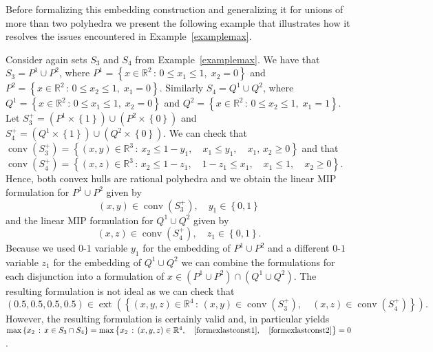 \documentclass[mnsc]{informs3}
\newcommand{\set}[1]{\left\{#1\right\}}                     %
\newcommand{\bra}[1]{\left(#1\right)}
\newcommand{\Real}{\mathbb R}
\DeclareMathOperator{\conv}{conv}
\DeclareMathOperator{\ext}{ext}
\begin{document}
Before formalizing this embedding construction and generalizing it for unions of more than two polyhedra we present the following example that illustrates how it resolves the issues encountered in Example~\ref{examplemax}.
\begin{example}\label{examplemaxfixed} Consider again sets $S_3$ and $S_4$ from Example~\ref{examplemax}. We have that $S_3=P^1\cup P^2$,  where $P^1=\set{x\in \Real^2\,:\, 0\leq x_1\leq 1,\;x_2=0}$ and $P^2=\set{x\in \Real^2\,:\, 0\leq x_2\leq 1,\;x_1=0}$. Similarly $S_4=Q^1\cup Q^2$,  where $Q^1=\set{x\in \Real^2\,:\, 0\leq x_1\leq 1,\;x_2=0}$ and $Q^2=\set{x\in \Real^2\,:\, 0\leq x_2\leq 1,\;x_1=1}$. Let $S_3^+=\bra{P^1\times \set{1}} \cup \bra{P^2\times \set{0}}$ and $S_4^+=\bra{Q^1\times \set{1}} \cup \bra{Q^2\times \set{0}}$. We can check that $\conv\bra{S_3^+}=\set{\bra{x,y}\in \Real^3\,:\, x_2\leq 1-y_1,\quad x_1\leq y_1,\quad x_1,\,x_2\geq 0}$ and that  $\conv\bra{S_4^+}=\set{\bra{x,z}\in \Real^3\,:\,  x_2\leq 1-z_1,\quad 1-z_1 \leq x_1, \quad x_1\leq 1,\quad x_2\geq 0}$. Hence, both convex hulls are rational polyhedra and we obtain the linear MIP formulation for  $P^1\cup P^2$ given by 
\begin{equation}\label{formexlastconst1}
\bra{x,y}\in \conv\bra{S_3^+}, \quad y_1\in \set{0,1}
\end{equation}
and the linear MIP formulation for $Q^1\cup Q^2$  given by 
\begin{equation}\label{formexlastconst2}
\bra{x,z}\in \conv\bra{S_4^+}, \quad z_1\in \set{0,1}.
\end{equation}
Because we used $0$-$1$ variable $y_1$ for the embedding of $P^1\cup P^2$ and a different $0$-$1$ variable $z_1$ for the embedding of $Q^1\cup Q^2$ we can combine the formulations for each disjunction into a formulation of $x\in \bra{P^1\cup P^2}\cap \bra{Q^1\cup Q^2}$. The resulting formulation is not ideal as we can  check that 
\[\bra{0.5,0.5,0.5,0.5}\in \ext\bra{\set{\bra{x,y,z}\in \Real^4\,:\, \bra{x,y}\in \conv\bra{S_3^+},\quad \bra{x,z}\in \conv\bra{S_4^+} }}.\]
However, the resulting formulation is certainly valid and, in particular yields $\max\set{x_2\,:\, x\in S_3\cap S_4}=\max\set{x_2\,:\, \bra{x,y,z}\in \Real^4,\quad \eqref{formexlastconst1},\quad \eqref{formexlastconst2} }=0$.
\end{example}
\end{document}
